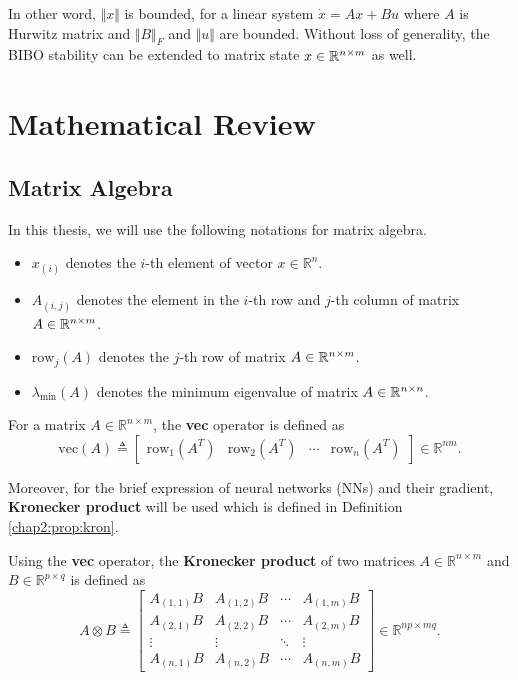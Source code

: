 In other word, $\Vert x\Vert$ is bounded, for a linear system $\dot x=Ax+Bu$ where $A$ is Hurwitz matrix and $\Vert B\Vert_F$ and $\Vert u\Vert$ are bounded.
Without loss of generality, the BIBO stability can be extended to matrix state $x\in\mathbb{R}^{n\times m}$ as well.

\section{Mathematical Review} 

\subsection{Matrix Algebra} 

In this thesis, we will use the following notations for matrix algebra.
\begin{itemize}
  \item $x_{(i)}$ denotes the $i$-th element of vector $x\in\mathbb R^n$.
  \item $A_{(i,j)}$ denotes the element in the $i$-th row and $j$-th column of matrix $A\in\mathbb{R}^{n\times m}$.
  \item $\text{row}_j(A)$ denotes the $j$-th row of matrix $A\in\mathbb{R}^{n\times m}$.
  \item $\lambda_\text{min}(A)$ denotes the minimum eigenvalue of matrix $A\in\mathbb{R}^{n\times n}$.
\end{itemize}

For a matrix $A\in\mathbb R^{n\times m}$, the \textbf{vec} operator is defined as
\begin{equation}
  \text{vec}(A) \triangleq 
  \begin{bmatrix}
      \text{row}_1(A^T) & \text{row}_2(A^T) & \cdots & \text{row}_n(A^T)
  \end{bmatrix}
  \in\mathbb R^{nm}
  .
\end{equation}

Moreover, for the brief expression of neural networks (NNs) and their gradient, \textbf{Kronecker product} will be used which is defined in Definition \ref{chap2:prop:kron}.

\begin{definition}
  Using the \textbf{vec} operator, the \textbf{Kronecker product} of two matrices $A\in\mathbb R^{n\times m}$ and $B\in\mathbb R^{p\times q}$ is defined as
  \begin{equation}
      A\otimes B\triangleq 
      \begin{bmatrix}
        A_{(1,1)}B & A_{(1,2)}B & \cdots & A_{(1,m)}B \\
        A_{(2,1)}B & A_{(2,2)}B & \cdots & A_{(2,m)}B \\
        \vdots & \vdots & \ddots & \vdots \\
        A_{(n,1)}B & A_{(n,2)}B & \cdots & A_{(n,m)}B
      \end{bmatrix}
      \in\mathbb R^{np\times mq}
      .
  \end{equation}
\end{definition}

